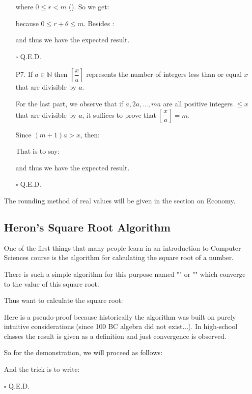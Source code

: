 \begin{enumerate}
\begin{dem}
			where $0 \leq r < m$ (). So we get:
				
				because $0 \leq r + \theta \leq m$. Besides :
				
				and thus we have the expected result.
				\begin{flushright}
					$\square$  Q.E.D.
				\end{flushright}
			\end{dem}

		\item[P7.] If $a \in \mathbb{N}$ then $\left[\dfrac{x}{a} \right]$ represents the number of integers less than or equal $x$ that are divisible by $a$.
			\begin{dem}
				For the last part, we observe that if $a, 2a,...,ma$ are all positive integers $\leq x$ that are divisible by $a$, it suffices to prove that $\left[\dfrac{x}{a}\right]=m$. 
				
				Since $(m+1)a>x$, then:
					
				That is to say:
					
				and thus we have the expected result.					
				\begin{flushright}
					$\square$  Q.E.D.
				\end{flushright}			
			\end{dem}
	\end{enumerate}
		\begin{tcolorbox}[title=Remark,colframe=black,arc=10pt]
The rounding method of real values will be given in the section on Economy.
	\end{tcolorbox}
	
	\subsection{Heron's Square Root Algorithm}
	
	One of the first things that many people learn in an introduction to Computer Sciences course is the algorithm for calculating the square root of a number. 
	
	There is such a simple algorithm for this purpose named "" or "" which converge to the value of this square root.
	
	Thus want to calculate the square root:
		
	\begin{dem}
		Here is a pseudo-proof because historically the algorithm was built on purely intuitive considerations (since 100 BC algebra did not exist...). In high-school classes the result is given as a definition and just convergence is observed.
		
		So for the demonstration, we will proceed as follows:
			
			And the trick is to write:
				
				\begin{flushright}
					$\square$  Q.E.D.
				\end{flushright}
	\end{dem}
	
